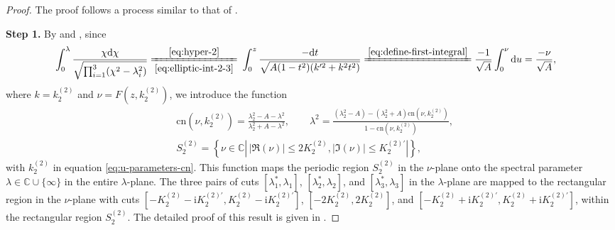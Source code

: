\documentclass[11pt,reqno]{amsart}
\newcommand{\ii}{\mathrm{i}}
\newcommand{\cn}{\mathrm{cn}}
\newcommand{\dd}{\mathrm{d}}
\numberwithin{equation}{section}
\begin{document}
\begin{proof}
	The proof follows a process similar to that of .
	
	\textbf{Step 1.}
	By  and , since
	\begin{equation}\nonumber
		\begin{split}
			\int_{0}^{\lambda}\frac{\chi \dd \chi}{\sqrt{\prod_{i=1}^3(\chi^2-\lambda_i^2)}}\xlongequal[\eqref{eq:elliptic-int-2-3}]{\eqref{eq:hyper-2}}&\ 
			\int_{0}^{z}\frac{- \dd t}{\sqrt{A(1-t^2)(k^{\prime2}+k^2t^2)}}
			\xlongequal{\eqref{eq:define-first-integral}} \frac{ -1 }{\sqrt{A}}\int_{0}^{\nu} \dd u
			= \frac{-\nu}{\sqrt{A}}, 
		\end{split}	
	\end{equation}
	where $k=k_2^{(2)}$ and $\nu=F(z,k_2^{(2)})$,
	we introduce the function
	\begin{equation}\label{eq:fs-3}
		\begin{split}
			&\cn(\nu,  k^{(2)}_2)=\frac{\lambda_2^2-A-\lambda^2}{\lambda_2^2+A-\lambda^2},
			\qquad 
			\lambda^2=\frac{(\lambda_2^2-A)-(\lambda_2^2+A)\cn(\nu,  k^{(2)}_2)}{1-\cn(\nu,  k^{(2)}_2)},
			\\
			& S^{(2)}_2=\left\{\nu \in \mathbb{C}\left|\, | \Re(\nu) | \le 2  K^{(2)}_2, |\Im(\nu)|\le   K^{(2)\prime}_2 \right|\right\},
		\end{split}
	\end{equation}
	with $ k^{(2)}_2$ in equation \eqref{eq:u-parameters-cn}.
	This function maps the periodic region $ S^{(2)} _{2}$ in the $\nu$-plane onto the spectral parameter $\lambda\in \mathbb{C}\cup \{\infty\}$ in the entire $\lambda$-plane. 
	The three pairs of cuts $[\lambda_1^*, \lambda_1]$, $[\lambda_2^*, \lambda_2]$, and $[\lambda_3^*, \lambda_3]$ in the $\lambda$-plane are mapped to the rectangular region in the $\nu$-plane with cuts $[-  K^{(2)}_2-\ii   K^{(2)\prime}_2 , K^{(2)}_2-\ii   K^{(2)\prime}_2]$, $[-2  K^{(2)}_2, 2  K^{(2)}_2]$, and $[-  K^{(2)}_2+\ii   K^{(2)\prime}_2 , K^{(2)}_2+\ii   K^{(2)\prime}_2]$, 
	within the rectangular region $S^{(2)}_2$.
	The detailed proof of this result is given in . 
	

\end{proof}
\end{document}

